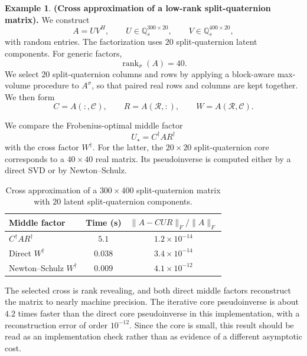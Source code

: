 \documentclass[12pt,a4paper]{article}
\theoremstyle{plain}
\theoremstyle{definition}
\newtheorem{example}[theorem]{Example}
\theoremstyle{remark}
\begin{document}
\begin{example}\label{subsec:ex3}
\textbf{(Cross approximation of a low-rank split-quaternion matrix).}
We construct
\[
    A=UV^H, \qquad U\in\mathbb{Q}_s^{300\times20}, \qquad V\in\mathbb{Q}_s^{400\times20},
\]
with random entries. The factorization uses \(20\) split-quaternion latent components. For generic factors,
\[
    \operatorname{rank}_\sigma(A)=40.
\]
We select \(20\) split-quaternion columns and rows by applying a block-aware max-volume procedure to \(A^\sigma\), so that paired real rows and columns are kept together. We then form
\[
    C=A(:,\mathcal C), \qquad R=A(\mathcal R,:), \qquad W=A(\mathcal R,\mathcal C).
\]

We compare the Frobenius-optimal middle factor
\[
    U_\star=C^\dagger A R^\dagger
\]
with the cross factor \(W^\dagger\). For the latter, the \(20\times20\) split-quaternion core corresponds to a \(40\times40\) real matrix. Its pseudoinverse is computed either by a direct SVD or by Newton--Schulz.

\begin{table}[H]
\centering
\caption{Cross approximation of a \(300\times400\) split-quaternion matrix with \(20\) latent split-quaternion components.}
\label{tab:cross}
\begin{tabular}{lcc}
\toprule
Middle factor & Time (s) &
\(\|A-CUR\|_F/\|A\|_F\) \\
\midrule
\(C^\dagger A R^\dagger\) & \(5.1\) & \(1.2\times10^{-14}\) \\
Direct \(W^\dagger\) & \(0.038\) & \(3.4\times10^{-14}\) \\
Newton--Schulz \(W^\dagger\) & \(0.009\) & \(4.1\times10^{-12}\) \\
\bottomrule
\end{tabular}
\end{table}

The selected cross is rank revealing, and both direct middle factors reconstruct the matrix to nearly machine precision. The iterative core pseudoinverse is about \(4.2\) times faster than the direct core pseudoinverse in this implementation, with a reconstruction error of order \(10^{-12}\). Since the core is small, this result should be read as an implementation check rather than as evidence of a different asymptotic cost.
\end{example}
\end{document}
